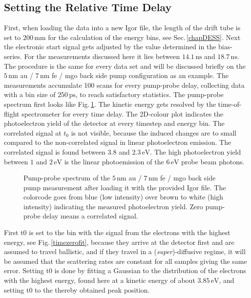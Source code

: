 \documentclass[a4paper,12pt,twoside]{article}
\begin{document}
    \subsection{Setting the Relative Time Delay}
        \label{chapSRT}
First, when loading the data into a new Igor file, the length of the drift tube is set to $200\,\mathrm{mm}$ for the calculation of the energy bins, see Sec.\,\ref{chapDESS}. Next the electronic start signal gets adjusted by the value determined in the bias-series. For the measurements discussed here it lies between $14.1\,\mathrm{ns}$ and $18.7\,\mathrm{ns}$. The procedure is the same for every data set and will be discussed briefly on the $5\,\mathrm{nm}$ \gls{au} / $7\,\mathrm{nm}$ \gls{fe} / \gls{mgo} back side pump configuration as an example. The measurements accumulate 100 scans for every pump-probe delay, collecting data with a bin size of $250\,\mathrm{ps}$, to reach satisfactory statistics. The pump-probe spectrum first looks like Fig.\,\ref{raw}. The kinetic energy gets resolved by the time-of-flight spectrometer for every time delay. The 2D-colour plot indicates the photoelectron yield of the detector at every timestep and energy bin. The correlated signal at $t_0$ is not visible, because the induced changes are to small compared to the non-correlated signal in linear photoelectron emission. The correlated signal is found between $3.8$ and $2.3\,\mathrm{eV}$. The high photoelectron yield between $1$ and $2\,\mathrm{eV}$ is the linear photoemission of the $6\,\mathrm{eV}$ probe beam photons.
	\begin{figure}[H]
		\caption{Pump-probe spectrum of the $5\,\mathrm{nm}$ \gls{au} / $7\,\mathrm{nm}$ \gls{fe} / \gls{mgo} back side pump measurement after loading it with the provided Igor file. The colorcode goes from blue (low intensity) over brown to white (high intensity) indicating the measured photoelectron yield. Zero pump-probe delay means a correlated signal.}
	    	\label{raw}
	\end{figure}
\noindent First \gls{t0} is set to the bin with the signal from the electrons with the highest energy, see Fig.\,\ref{timezerofit}, because they arrive at the detector first and are assumed to travel ballistic, and if they travel in a (\textit{super})-diffusive regime, it will be assumed that the scattering rates are constant for all samples giving the same error. Setting \gls{t0} is done by fitting a Gaussian to the distribution of the electrons with the highest energy, found here at a kinetic energy of about $3.85\,\mathrm{eV}$, and setting \gls{t0} to the thereby obtained peak position. 
\end{document}
